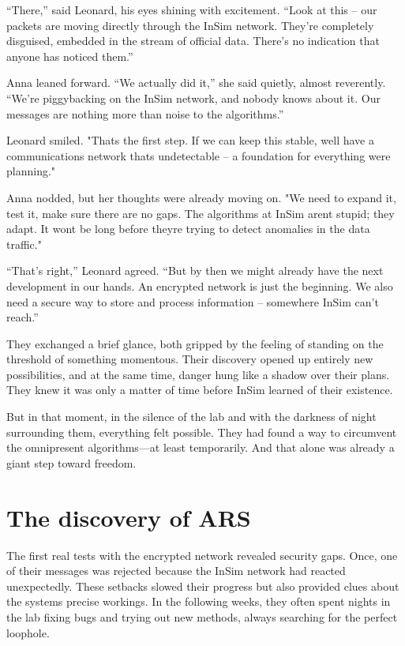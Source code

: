 \documentclass[
]{article}
\begin{document}
``There,'' said Leonard, his eyes shining with excitement. ``Look at this -- our packets are moving directly through the InSim network. They're completely disguised, embedded in the stream of official data. There's no indication that anyone has noticed them.''

Anna leaned forward. ``We actually did it,'' she said quietly, almost reverently. ``We're piggybacking on the InSim network, and nobody knows about it. Our messages are nothing more than noise to the algorithms.''

Leonard smiled. "That\textquotesingle s the first step. If we can keep this stable, we\textquotesingle ll have a communications network that\textquotesingle s undetectable -- a foundation for everything we\textquotesingle re planning."

Anna nodded, but her thoughts were already moving on. "We need to expand it, test it, make sure there are no gaps. The algorithms at InSim aren\textquotesingle t stupid; they adapt. It won\textquotesingle t be long before they\textquotesingle re trying to detect anomalies in the data traffic."

``That's right,'' Leonard agreed. ``But by then we might already have the next development in our hands. An encrypted network is just the beginning. We also need a secure way to store and process information -- somewhere InSim can't reach.''

They exchanged a brief glance, both gripped by the feeling of standing on the threshold of something momentous. Their discovery opened up entirely new possibilities, and at the same time, danger hung like a shadow over their plans. They knew it was only a matter of time before InSim learned of their existence.

But in that moment, in the silence of the lab and with the darkness of night surrounding them, everything felt possible. They had found a way to circumvent the omnipresent algorithms---at least temporarily. And that alone was already a giant step toward freedom.

\section{The discovery of ARS}\label{the-discovery-of-ars}

The first real tests with the encrypted network revealed security gaps. Once, one of their messages was rejected because the InSim network had reacted unexpectedly. These setbacks slowed their progress but also provided clues about the system\textquotesingle s precise workings. In the following weeks, they often spent nights in the lab fixing bugs and trying out new methods, always searching for the perfect loophole.
\end{document}
